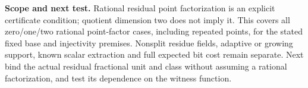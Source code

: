 \documentclass[11pt]{article}
\begin{document}
\textbf{Scope and next test.}
Rational residual point factorization is an explicit certificate condition;
quotient dimension two does not imply it. This covers all zero/one/two rational
point-factor cases, including repeated points, for the stated fixed base and
injectivity premises. Nonsplit residue fields, adaptive or growing support,
known scalar extraction and full expected bit cost remain separate. Next bind
the actual residual fractional unit and class without assuming a rational
factorization, and test its dependence on the witness function.
\end{document}
